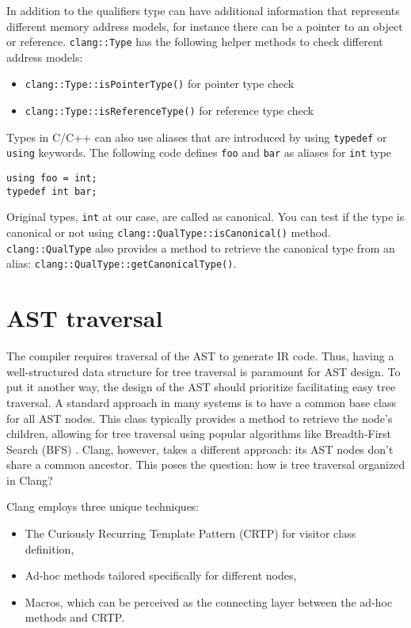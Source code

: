 In addition to the qualifiers type can have additional information that
represents different memory address models, for instance there can be a
pointer to an object or
reference. \texttt{clang::Type}
has the following helper methods to check different address models:
\begin{itemize}
\item \texttt{clang::Type::isPointerType()} for pointer type check
\item \texttt{clang::Type::isReferenceType()} for reference type check
\end{itemize}

Types in C/C++ can also use aliases that are introduced by using
\texttt{typedef} or \texttt{using} keywords. The following
code defines \texttt{foo} and \texttt{bar} as aliases for
\texttt{int} type
\begin{verbatim}
using foo = int;
typedef int bar;
\end{verbatim}
Original types, \texttt{int} at our case, are called as canonical. You
can test if the type is canonical or not using
\texttt{clang::QualType::isCanonical()}
method. \texttt{clang::QualType} also provides a method to retrieve the
canonical type from an alias: \texttt{clang::QualType::getCanonicalType()}.

\section{AST traversal}
\label{sec:ch3:ast_traversal}
The compiler requires traversal of the AST to generate IR code. Thus, having a
well-structured data structure for tree traversal is paramount for AST
design. To put it another way, the design of the AST should prioritize
facilitating easy tree traversal. A standard approach in many systems is to have
a common base class for all AST nodes. This class typically provides a method to
retrieve the node's children, allowing for tree traversal using popular
algorithms like Breadth-First Search (BFS)
\cite{book:cormen2009introduction}. Clang, however, takes a different approach:
its AST nodes don't share a common ancestor. This poses the question: how is
tree traversal organized in Clang? 

Clang employs three unique techniques:
\begin{itemize}
\item The Curiously Recurring Template Pattern (CRTP) for visitor class definition,
\item Ad-hoc methods tailored specifically for different nodes,
\item Macros, which can be perceived as the connecting layer between the ad-hoc methods and CRTP.
\end{itemize}

